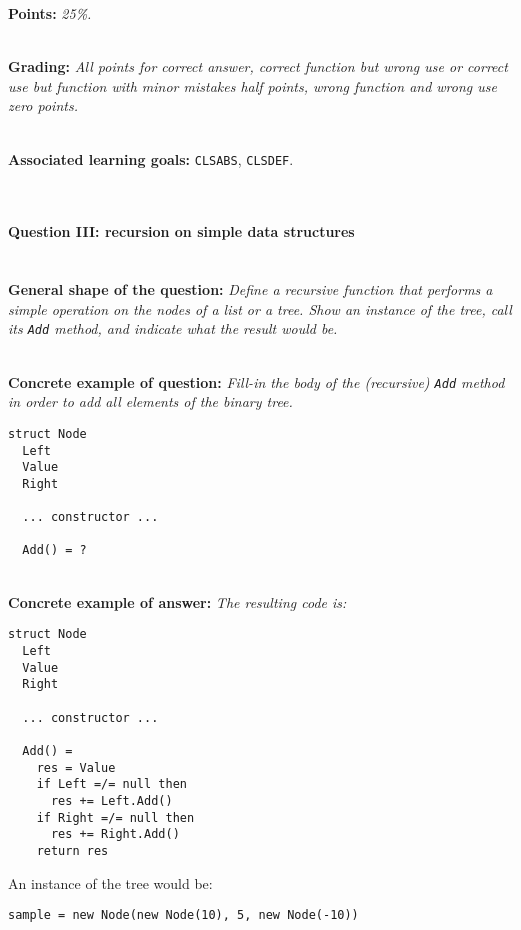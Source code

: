 \documentclass[12pt,a4paper,final]{article}
\begin{document}
\textbf{Points:} \textit{25\%.}

\ \\ 

\textbf{Grading:} \textit{All points for correct answer, correct function but wrong use or correct use but function with minor mistakes half points, wrong function and wrong use zero points.}

\ \\ 

\textbf{Associated learning goals:} \texttt{CLSABS}, \texttt{CLSDEF}.

\ \\ 


\paragraph{Question III: recursion on simple data structures} \ \\

\textbf{General shape of the question:} \textit{Define a recursive function that performs a simple operation on the nodes of a list or a tree. Show an instance of the tree, call its \texttt{Add} method, and indicate what the result would be.}

\ \\ 

\textbf{Concrete example of question:} \textit{Fill-in the body of the (recursive) \texttt{Add} method in order to add all elements of the binary tree.}

\begin{lstlisting}
struct Node
  Left
  Value
  Right
  
  ... constructor ...
  
  Add() = ?
\end{lstlisting}

\ \\ 

\textbf{Concrete example of answer:} \textit{The resulting code is:}

\begin{lstlisting}
struct Node
  Left
  Value
  Right
  
  ... constructor ...

  Add() = 
  	res = Value
  	if Left =/= null then
  	  res += Left.Add()
  	if Right =/= null then
  	  res += Right.Add()
  	return res
\end{lstlisting}

An instance of the tree would be:

\begin{lstlisting}
sample = new Node(new Node(10), 5, new Node(-10))
\end{lstlisting}
\end{document}
